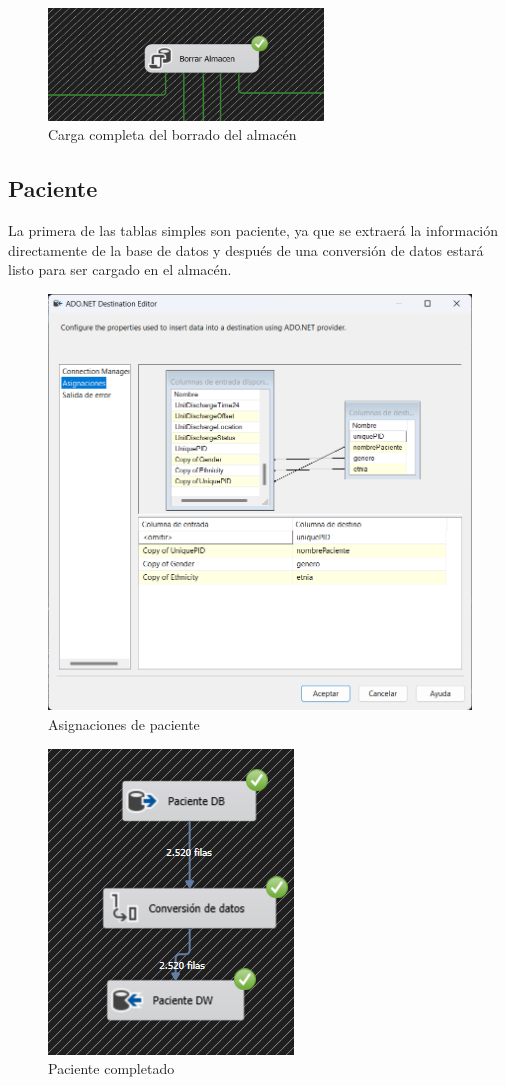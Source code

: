\documentclass{article}
\begin{document}
	\begin{figure}[H]
		\begin{center} 
			\includegraphics[width=0.65\textwidth]{images/completados/borrado_almacen.png}
			\caption{Carga completa del borrado del almacén}
			\label{fig:borrado_completo}
		\end{center}
	\end{figure}
	
	\subsection{Paciente}
	La primera de las tablas simples son paciente, ya que se extraerá la información directamente de la base de datos y después de una conversión de datos estará listo para ser cargado en el almacén.
	\begin{figure}[H]
		\centering
		\includegraphics[width=.7\linewidth]{./images/asignaciones/paciente.png}
		\caption{Asignaciones de paciente}
	\end{figure}
	\begin{figure}[H]
		\centering
		\includegraphics[width=.3\linewidth]{./images/completados/paciente.png}
		\caption{Paciente completado}
	\end{figure}
\end{document}
